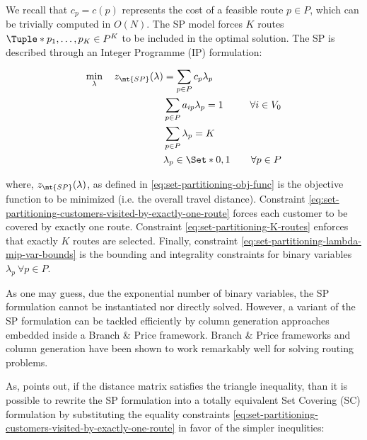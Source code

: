 We recall that $c_p = c(p)$ represents the cost of a feasible route $p \in P$, which can be trivially computed in $O(N)$.
The SP model forces $K$ routes $\Tuple*{p_1, \dots, p_K} \in P^K$ to be included in the optimal solution.
The SP is described through an Integer Programme (IP) formulation:


\begin{align}
	\min_{\lambda} \quad z_\mt{SP}(\lambda) & = \sum_{p \in P}  c_p \lambda_p \label{eq:set-partitioning-obj-func}                                                                                                                                           \\
	                                        & \sum_{p \in P}  a_{ip} \lambda_p = 1                                & \quad \forall i \in V_0                                              \label{eq:set-partitioning-customers-visited-by-exactly-one-route} \\
	                                        & \sum_{p \in P} \lambda_{p} = K\label{eq:set-partitioning-K-routes}                                                                                                                                             \\
	                                        & \lambda_p                    \in \Set*{0, 1}                         & \quad \forall p \in P \label{eq:set-partitioning-lambda-mip-var-bounds}
\end{align}

where, $z_\mt{SP}(\lambda)$, as defined in \eqref{eq:set-partitioning-obj-func} is the objective function to be minimized (i.e. the overall travel distance).
Constraint \eqref{eq:set-partitioning-customers-visited-by-exactly-one-route} forces each customer to be covered by exactly one route.
Constraint \eqref{eq:set-partitioning-K-routes} enforces that exactly $K$ routes are selected.
Finally, constraint \eqref{eq:set-partitioning-lambda-mip-var-bounds} is the bounding and integrality constraints for binary variables $\lambda_p \ \forall p \in P$.

As one may guess, due the exponential number of binary variables, the SP formulation cannot be instantiated nor directly solved.
However, a variant of the SP formulation can be tackled efficiently by column generation approaches embedded inside a Branch \& Price framework.
Branch \& Price frameworks and column generation have been shown to work remarkably well for solving routing problems.


As, \textcite{toth2002} points out, if the distance matrix satisfies the triangle inequality,
than it is possible to rewrite the SP formulation into a totally equivalent Set Covering (SC) formulation
by substituting the equality constraints \eqref{eq:set-partitioning-customers-visited-by-exactly-one-route} in favor of the simpler inequlities:

